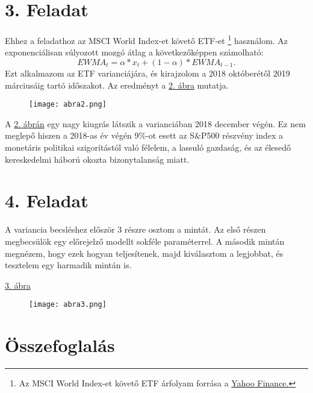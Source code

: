 \documentclass[a4paper,12pt]{article}
\begin{document}
\section{3. Feladat}
Ehhez a feladathoz az MSCI World Index-et követő ETF-et
\footnote{Az MSCI World Index-et követő ETF árfolyam forrása a  
\href{https://finance.yahoo.com/quote/XWD.TO/history/}{Yahoo Finance.}
} használom. 
Az exponenciálisan súlyozott mozgó átlag a következőképpen számolható:
\begin{equation}
EWMA_t=\alpha * x_t + (1-\alpha)*EWMA_{t-1}. 
\end{equation}
Ezt alkalmazom az ETF varianciájára, és kirajzolom a 2018 októberétől 2019 márciusáig tartó időszakot. 
Az eredményt a \hyperref[fig:fig2]{2. ábra} mutatja. 
\begin{figure}[H]
\caption{}
        \centering
        \texttt{[image: abra2.png]}
\label{fig:fig2}
\end{figure}
A \hyperref[fig:fig2]{2. ábrán} egy nagy kiugrás látszik a varianciában 2018 december végén. 
Ez nem meglepő hiszen a 2018-as év végén 9\%-ot esett az S\&P500 részvény index a monetáris politikai szigorítástól való félelem, a lassuló gazdaság, és az élesedő kereskedelmi háború okozta bizonytalanság miatt. 

\section{4. Feladat}
A variancia becsléshez először 3 részre osztom a mintát. 
Az első részen megbecsülök egy előrejelző modellt sokféle paraméterrel. 
A második mintán megnézem, hogy ezek hogyan teljesítenek, majd kiválasztom a legjobbat, és tesztelem egy harmadik mintán is. 



\hyperref[fig:fig3]{3. ábra}


\begin{figure}[H]
\caption{}
        \centering
        \texttt{[image: abra3.png]}
\label{fig:fig3}
\end{figure}
\section{Összefoglalás}



\newpage


\end{document}
